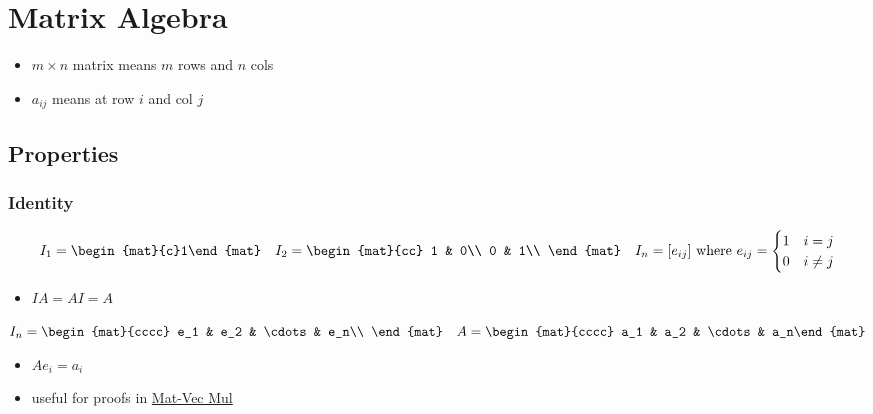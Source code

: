 \section{Matrix Algebra}
    \begin{definition}
        \begin{itemize}
            \item $m\times n$ matrix means $m$ rows and $n$ cols
            \item $a_{ij}$ means at row $i$ and col $j$
        \end{itemize}
    \end{definition}
	\subsection{Properties}
        \subsubsection{Identity}	
			\begin{definition}
				$$I_1=\begin{mat}{c}1\end{mat}\quad 
				I_2=\begin{mat}{cc}
					1 & 0\\
					0 & 1\\
				\end{mat}\quad
				I_n=[e_{ij}]\text{ where } e_{ij}=\begin{cases}
					1&i=j\\
					0&i\ne j\\
				\end{cases}$$
				\begin{itemize}
					\item $IA = AI = A$
				\end{itemize}
			\end{definition}
			\begin{definition}
				$I_n=\begin{mat}{cccc} e_1 & e_2 & \cdots & e_n\\ \end{mat}\quad A=\begin{mat}{cccc} a_1 & a_2 & \cdots & a_n\end{mat}$
				\begin{itemize}
					\item $Ae_i=a_i$ 
					\item useful for proofs in \hyperref[sec:standard-basis]{Mat-Vec Mul}
				\end{itemize}
			\end{definition}
